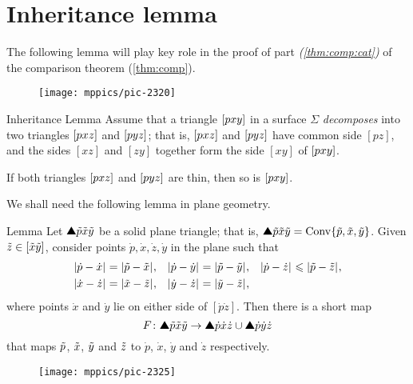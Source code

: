 \section*{Inheritance lemma}

The following lemma will play key role in the proof of part \textit{(\ref{thm:comp:cat})} of the comparison theorem (\ref{thm:comp}).

\begin{wrapfigure}{r}{25mm}
\vskip-0mm
\centering
\texttt{[image: mppics/pic-2320]}
\end{wrapfigure}

\begin{thm}{Inheritance Lemma}
\label{lem:inherit-angle} 
Assume that a triangle $\trig p x y$ in a surface $\Sigma$ \emph{decomposes} 
into two triangles $\trig p x z$ and $\trig p y z$;
that is, $\trig p x z$ and $\trig p y z$ have common side $[p z]$, and the sides $[x z]$ and $[z y]$ together form the side $[x y]$ of $\trig p x y$.

If  both triangles $\trig p x z$ and $\trig p y z$ are thin, 
then so is  $\trig p x y$.
\end{thm} 

We shall need the following lemma in plane geometry.


\begin{thm}{Lemma}\label{lem:quadrangle}
Let $\solidtriangle{\~p}{\~x}{\~y}$ be a solid plane triangle; that is, $\solidtriangle{\~p}{\~x}{\~y}\z=\Conv\{{\~p},{\~x},{\~y}\}$.
Given  $\~z\in[\~x\~y]$,
consider  points $\dot p, \dot x, \dot z, \dot y$ in the plane such that 
\begin{align*}
\dist{\dot p}{\dot x}{}&=\dist{\~p}{\~x}{},
&
\dist{\dot p}{\dot y}{}&=\dist{\~p}{\~y}{},
&
\dist{\dot p}{\dot z}{}&\le \dist{\~p}{\~z}{},
\\
\dist{\dot x}{\dot z}{}&=\dist{\~x}{\~z}{},
&
\dist{\dot y}{\dot z}{}&=\dist{\~y}{\~z}{},
\end{align*}
where points $\dot x$ and $\dot y$ lie on either side of $[\dot p\dot z]$.
Then there is a short map 
\[F\:\solidtriangle{\~p}{\~x}{\~y}\to \solidtriangle{\dot p}{\dot x}{\dot z}\cup \solidtriangle{\dot p} {\dot y} {\dot z}\]
that maps $\~p$, $\~x$, $\~y$ and $\~z$ to $\dot p$, $\dot x$, $\dot y$ and $\dot z$ respectively.
\end{thm}

\begin{wrapfigure}{r}{45 mm}
\vskip-4mm
\centering
\texttt{[image: mppics/pic-2325]}
\end{wrapfigure}

